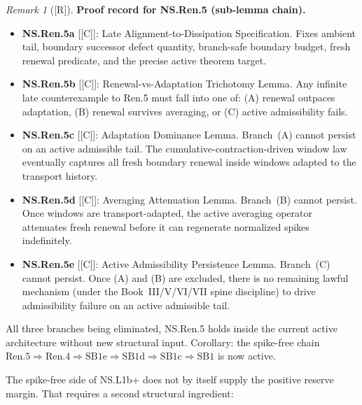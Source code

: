 \documentclass[12pt,oneside]{amsbook}
\theoremstyle{plain}
\theoremstyle{definition}
\theoremstyle{remark}
\newtheorem{remark}[theorem]{Remark}
\newcommand{\status}[1]{\textup{[#1]}}
\begin{document}
\begin{remark}[\status{R}]\label{rmk:Ren5-proof-record}
\textbf{Proof record for NS.Ren.5 (sub-lemma chain).}
\begin{itemize}
\item \textbf{NS.Ren.5a} [\status{C}]: Late Alignment-to-Dissipation
 Specification. Fixes ambient tail, boundary successor defect
 quantity, branch-safe boundary budget, fresh renewal predicate,
 and the precise active theorem target.
\item \textbf{NS.Ren.5b} [\status{C}]: Renewal-vs-Adaptation
 Trichotomy Lemma. Any infinite late counterexample to Ren.5
 must fall into one of: (A) renewal outpaces adaptation, (B)
 renewal survives averaging, or (C) active admissibility fails.
\item \textbf{NS.Ren.5c} [\status{C}]: Adaptation Dominance Lemma.
 Branch~(A) cannot persist on an active admissible tail. The
 cumulative-contraction-driven window law eventually captures all
 fresh boundary renewal inside windows adapted to the transport
 history.
\item \textbf{NS.Ren.5d} [\status{C}]: Averaging Attenuation Lemma.
 Branch~(B) cannot persist. Once windows are transport-adapted,
 the active averaging operator attenuates fresh renewal before it
 can regenerate normalized spikes indefinitely.
\item \textbf{NS.Ren.5e} [\status{C}]: Active Admissibility
 Persistence Lemma. Branch~(C) cannot persist. Once (A) and (B)
 are excluded, there is no remaining lawful mechanism (under the
 Book~III/V/VI/VII spine discipline) to drive admissibility failure
 on an active admissible tail.
\end{itemize}
All three branches being eliminated, NS.Ren.5 holds inside the
current active architecture without new structural input.
Corollary: the spike-free chain
$\mathrm{Ren.5} \Rightarrow \mathrm{Ren.4} \Rightarrow
\mathrm{SB1e} \Rightarrow \mathrm{SB1d} \Rightarrow
\mathrm{SB1c} \Rightarrow \mathrm{SB1}$
is now active.
\end{remark}

The spike-free side of NS.L1b+ does not by itself supply the
positive reserve margin. That requires a second structural
ingredient:
\end{document}
